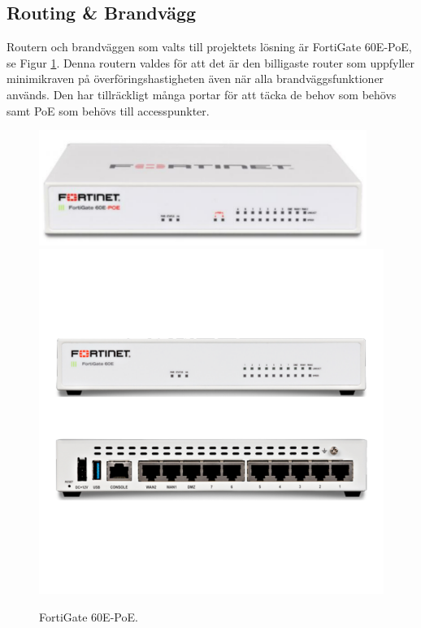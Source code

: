 \subsection{Routing \& Brandvägg}
    Routern och brandväggen som valts till projektets lösning är FortiGate 60E-PoE, se Figur \ref{fig:router-60e}. Denna routern valdes för att det är den billigaste router som uppfyller minimikraven på överföringshastigheten även när alla brandväggsfunktioner används. Den har tillräckligt många portar för att täcka de behov som behövs samt PoE som behövs till accesspunkter.
    
    \begin{figure}[htb]
        \centering
        \includegraphics[width=0.95\textwidth, clip, trim={0 0 0 0}]{pics/FortiGate-60E-POE-Frontside.pdf}
        \includegraphics[width=\textwidth, clip, trim={0 3cm 0 6.5cm}]{pics/fortigate-60e-facerear.pdf}
        \caption[FortiGate-60E]{FortiGate 60E-PoE.}
        \label{fig:router-60e}
    \end{figure}


